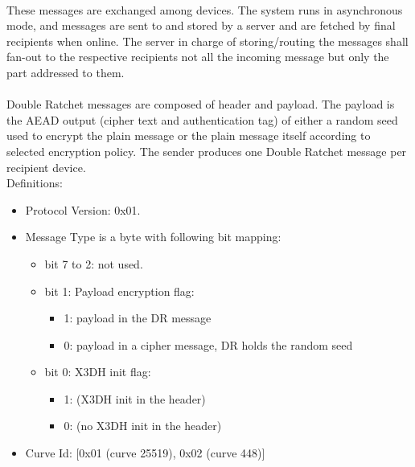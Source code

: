 \documentclass[a4paper,11pt]{article}
\begin{document}
    \paragraph*{}These messages are exchanged among devices. The system runs in asynchronous mode, and messages are sent to and stored by a server and are fetched by final recipients when online. The server in charge of storing/routing the messages shall fan-out to the respective recipients not all the incoming message but only the part addressed to them.

    \paragraph*{}Double Ratchet messages are composed of header and payload. The payload is the AEAD output (cipher text and authentication tag) of either a random seed used to encrypt the plain message or the plain message itself according to selected encryption policy. The sender produces one Double Ratchet message per recipient device.\\
      Definitions:
      \begin{itemize}
      \item Protocol Version: 0x01.
      \item Message Type is a byte with following bit mapping:
        \begin{itemize}
          \item bit 7 to 2: not used.
          \item bit 1: Payload encryption flag:
            \begin{itemize}
              \item 1: payload in the DR message
              \item 0: payload in a cipher message, DR holds the random seed
            \end{itemize}
          \item bit 0: X3DH init flag:
            \begin{itemize}
              \item 1: (X3DH init in the header)
              \item 0: (no X3DH init in the header)
            \end{itemize}
        \end{itemize}
      \item Curve Id: [0x01 (curve 25519), 0x02 (curve 448)]
      \end{itemize}
\end{document}
